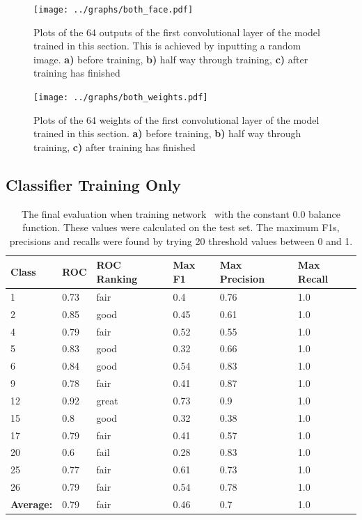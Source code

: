         \begin{figure}[!h]\label{fig:TODODOOD4OODO}
        \centering
        \texttt{[image: ../graphs/both\_face.pdf]}
        \caption{Plots of the 64 outputs of the first convolutional layer of the model trained in this section.
        This is achieved by inputting a random image.
        {\bf a)} before training,
        {\bf b)} half way through training,
        {\bf c)} after training has finished
        }
        \end{figure}

        \begin{figure}[!h]\label{fig:TODODOOD5OODO}
        \centering
        \texttt{[image: ../graphs/both\_weights.pdf]}
        \caption{Plots of the 64 weights of the first convolutional layer of the model trained in this section.
        {\bf a)} before training,
        {\bf b)} half way through training,
        {\bf c)} after training has finished
        }
        \end{figure}

      \clearpage
      \subsection{Classifier Training Only}

      \begin{table}[!h]
      \centering
      {\footnotesize
      \begin{tabular}{llllll}
      \hline
      \textbf{Class}    & \textbf{ROC} & \textbf{ROC Ranking} & \textbf{Max F1} & \textbf{Max Precision} & \textbf{Max Recall} \\ \hline
      1 &	0.73 &	fair &	0.4 	&0.76 	&1.0\\
      2 &	0.85 &	good &	0.45 &	0.61 &	1.0\\
      4 &	0.79 &	fair &	0.52 &	0.55 &	1.0\\
      5 &	0.83 &	good &	0.32 &	0.66 &	1.0\\
      6 &	0.84 &	good &	0.54 &	0.83 &	1.0\\
      9 &	0.78 &	fair &	0.41 &	0.87 &	1.0\\
      12 &	0.92 &	great& 	0.73& 	0.9 &	1.0\\
      15 &	0.8 	&good 	&0.32 	&0.38 	&1.0\\
      17 &	0.79 &	fair &	0.41 &	0.57 &	1.0\\
      20 &	0.6 	&fail 	&0.28 	&0.83 	&1.0\\
      25 &	0.77 &	fair &	0.61 &	0.73 &	1.0\\
      26 &	0.79 &	fair &	0.54 &	0.78 &	1.0\\ \hline
      \textbf{Average:} &	0.79 &	fair &	0.46 &	0.7 	&1.0  \\ \hline
      \end{tabular} }
      \caption{The final evaluation when training network \networkII\ with the constant 0.0 balance function.
            These values were
            calculated on the test set. The maximum F1s, precisions and recalls
            were found by trying 20 threshold values between 0 and 1.}
      \label{tab:biglisiiit}
      \end{table}


